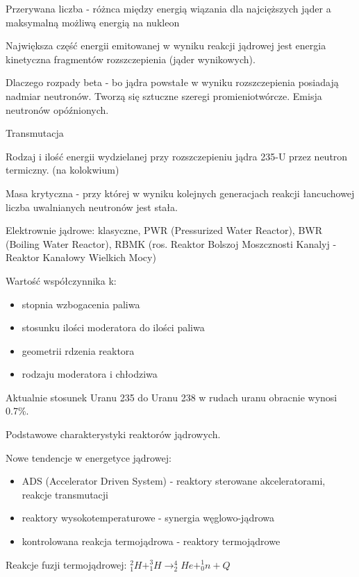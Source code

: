 \documentclass{article}
\begin{document}
Przerywana liczba - różnca między energią wiązania dla najcięższych jąder a maksymalną możliwą energią na nukleon

Największa część energii emitowanej w wyniku reakcji jądrowej jest energia kinetyczna fragmentów rozszczepienia (jąder wynikowych).

Dlaczego rozpady beta - bo jądra powstałe w wyniku rozszczepienia posiadają nadmiar neutronów. Tworzą się sztuczne szeregi promieniotwórcze. Emisja neutronów opóźnionych.

Transmutacja

Rodzaj i ilość energii wydzielanej przy rozszczepieniu jądra 235-U przez neutron termiczny. (na kolokwium)

Masa krytyczna - przy której w wyniku kolejnych generacjach reakcji łancuchowej liczba uwalnianych neutronów  jest stała.

Elektrownie jądrowe: klasyczne, PWR (Pressurized Water Reactor), BWR (Boiling Water Reactor), RBMK (ros. Reaktor Bolszoj Moszcznosti Kanalyj -  Reaktor Kanałowy Wielkich Mocy)

Wartość współczynnika k:
\begin{itemize}
    \item stopnia wzbogacenia paliwa
    \item stosunku ilości moderatora do ilości paliwa
    \item geometrii rdzenia reaktora
    \item rodzaju moderatora i chłodziwa
\end{itemize}

Aktualnie stosunek Uranu 235 do Uranu 238 w rudach uranu obracnie wynosi 0.7\%.

Podstawowe charakterystyki reaktorów jądrowych.

Nowe tendencje w energetyce jądrowej:
\begin{itemize}
    \item ADS (Accelerator Driven System) - reaktory sterowane akceleratorami, reakcje transmutacji
    \item reaktory wysokotemperaturowe - synergia węglowo-jądrowa
    \item kontrolowana reakcja termojądrowa - reaktory termojądrowe
\end{itemize}

Reakcje fuzji termojądrowej: $_1^2H + _1^3H \rightarrow _2^4He + _0^1n + Q$
\end{document}
